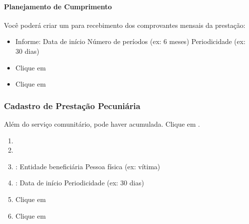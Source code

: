 \documentclass[letterpaper,10pt,brazil]{sphinxmanual}
\begin{document}
\paragraph{Planejamento de Cumprimento}
\label{\detokenize{projud_54_cadastromedidasalternativas:planejamento-de-cumprimento}}
\sphinxAtStartPar
Você poderá criar um  para recebimento dos comprovantes mensais da prestação:
\begin{itemize}
\item {} 
\sphinxAtStartPar
Informe:
\sphinxhyphen{} Data de início
\sphinxhyphen{} Número de períodos (ex: 6 meses)
\sphinxhyphen{} Periodicidade (ex: 30 dias)

\item {} 
\sphinxAtStartPar
Clique em 

\item {} 
\sphinxAtStartPar
Clique em 

\end{itemize}


\subsubsection{Cadastro de Prestação Pecuniária}
\label{\detokenize{projud_54_cadastromedidasalternativas:cadastro-de-prestacao-pecuniaria}}
\sphinxAtStartPar
Além do serviço comunitário, pode haver  acumulada. Clique em .
\begin{enumerate}
%
\item {} 
\sphinxAtStartPar
{}

\item {} 
\sphinxAtStartPar
{}

\item {} 
\sphinxAtStartPar
{}:
\sphinxhyphen{} Entidade beneficiária
\sphinxhyphen{} Pessoa física (ex: vítima)

\item {} 
\sphinxAtStartPar
{}:
\sphinxhyphen{} Data de início
\sphinxhyphen{} Periodicidade (ex: 30 dias)

\item {} 
\sphinxAtStartPar
Clique em 

\item {} 
\sphinxAtStartPar
Clique em 

\end{enumerate}
\end{document}
